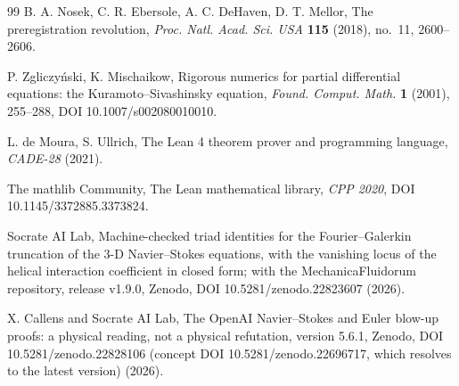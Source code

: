 \documentclass[11pt]{article}
\begin{document}
\begin{thebibliography}{99}
 B. A. Nosek, C. R. Ebersole, A. C. DeHaven, D. T. Mellor, The
preregistration revolution, \emph{Proc. Natl. Acad. Sci. USA} \textbf{115} (2018), no.~11,
2600--2606.

 P. Zgliczy\'nski, K. Mischaikow, Rigorous numerics for partial
differential equations: the Kuramoto--Sivashinsky equation, \emph{Found. Comput. Math.}
\textbf{1} (2001), 255--288, DOI 10.1007/s002080010010.

 L. de Moura, S. Ullrich, The Lean 4 theorem prover and programming language,
\emph{CADE-28} (2021).

 The mathlib Community, The Lean mathematical library, \emph{CPP 2020}, DOI
10.1145/3372885.3373824.

 Socrate AI Lab, Machine-checked triad identities for the
Fourier--Galerkin truncation of the 3-D Navier--Stokes equations, with the vanishing locus of
the helical interaction coefficient in closed form; with the MechanicaFluidorum repository,
release v1.9.0, Zenodo, DOI 10.5281/zenodo.22823607 (2026).

 X. Callens and Socrate AI Lab, The OpenAI Navier--Stokes and Euler
blow-up proofs: a physical reading, not a physical refutation, version 5.6.1, Zenodo, DOI
10.5281/zenodo.22828106 (concept DOI 10.5281/zenodo.22696717, which resolves to the latest
version) (2026).

\end{thebibliography}
\end{document}

